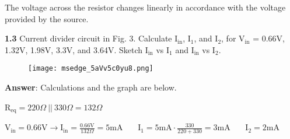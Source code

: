 \documentclass{article}
\begin{document}
\begin{center}
\end{center}

\vspace{4mm}

{The voltage across the resistor changes linearly in accordance with the voltage provided by the source.}

\vspace{8mm}

{\textbf{1.3} Current divider circuit in Fig. 3. Calculate I$_{\text{in}}$,  I$_1$, and I$_2$, for V$_{\text{in}}$ = 0.66V, 1.32V, 1.98V, 3.3V, and 3.64V. Sketch I$_{\text{in}}$ vs I$_1$ and I$_{\text{in}}$ vs I$_2$.}

\begin{figure}[H]
    \centering
    \texttt{[image: msedge\_5aVv5c0yu8.png]}
\end{figure}

\vspace{4mm}

{\textbf{Answer}: Calculations and the graph are below.}

\vspace{4mm}

{R$\displaystyle _\text{eq} = 220\Omega \ || \ 330\Omega = 132\Omega $}

\vspace{4mm}

{V$\displaystyle _\text{in} = 0.66\text{V} \rightarrow  \text{I}_\text{in} = \frac{0.66\text{V}}{132\Omega} = 5\text{mA} $} \ \ \ {$\displaystyle \text{I}_\text{1} =  5\text{mA} \cdot\frac{\text{330}}{220 + 330} = 3\text{mA} $} \ \ \ {$\displaystyle \text{I}_\text{2} = 2\text{mA} $}
\end{document}
